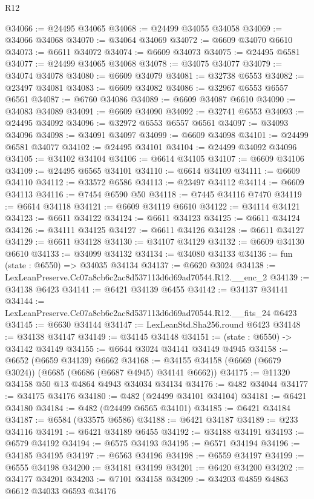 \begin{lexlean}{R12}
\begin{coremodule}
@34066 := @24495 @34065
@34068 := @24499 @34055 @34058
@34069 := @34066 @34068
@34070 := @34064 @34069
@34072 := @6609 @34070 @6610
@34073 := @6611 @34072
@34074 := @6609 @34073
@34075 := @24495 @6581
@34077 := @24499 @34065 @34068
@34078 := @34075 @34077
@34079 := @34074 @34078
@34080 := @6609 @34079
@34081 := @32738 @6553
@34082 := @23497 @34081
@34083 := @6609 @34082
@34086 := @32967 @6553 @6557 @6561
@34087 := @6760 @34086
@34089 := @6609 @34087 @6610
@34090 := @34083 @34089
@34091 := @6609 @34090
@34092 := @32741 @6553
@34093 := @24495 @34092
@34096 := @32972 @6553 @6557 @6561
@34097 := @34093 @34096
@34098 := @34091 @34097
@34099 := @6609 @34098
@34101 := @24499 @6581 @34077
@34102 := @24495 @34101
@34104 := @24499 @34092 @34096
@34105 := @34102 @34104
@34106 := @6614 @34105
@34107 := @6609 @34106
@34109 := @24495 @6565 @34101
@34110 := @6614 @34109
@34111 := @6609 @34110
@34112 := @33572 @6586
@34113 := @23497 @34112
@34114 := @6609 @34113
@34116 := @7454 @6590 @50
@34118 := @7445 @34116 @7470
@34119 := @6614 @34118
@34121 := @6609 @34119 @6610
@34122 := @34114 @34121
@34123 := @6611 @34122
@34124 := @6611 @34123
@34125 := @6611 @34124
@34126 := @34111 @34125
@34127 := @6611 @34126
@34128 := @6611 @34127
@34129 := @6611 @34128
@34130 := @34107 @34129
@34132 := @6609 @34130 @6610
@34133 := @34099 @34132
@34134 := @34080 @34133
@34136 := fun (state : @6550) => @34035 @34134
@34137 := @6620 @3024
@34138 := LexLeanPreserve.Cc07a8cb6c2ac8d537113d6d69ad70544.R12.__enc_2
@34139 := @34138 @6423
@34141 := @6421 @34139 @6455
@34142 := @34137 @34141
@34144 := LexLeanPreserve.Cc07a8cb6c2ac8d537113d6d69ad70544.R12.__fits_24 @6423
@34145 := @6630 @34144
@34147 := LexLeanStd.Sha256.round @6423
@34148 := @34138 @34147
@34149 := @34145 @34148
@34151 := (state : @6550) -> @34142 @34149
@34155 := @6644 @3024 @34141 @34149 @4945
@34158 := @6652 (@6659 @34139) @6662
@34168 := @34155 @34158 (@6669 (@6679 @3024)) (@6685 (@6686 (@6687 @4945) @34141 @6662))
@34175 := @11320 @34158 @50 @13 @4864 @4943 @34034 @34134
@34176 := @482 @34044
@34177 := @34175 @34176
@34180 := @482 (@24499 @34101 @34104)
@34181 := @6421 @34180
@34184 := @482 (@24499 @6565 @34101)
@34185 := @6421 @34184
@34187 := @6584 (@33575 @6586)
@34188 := @6421 @34187
@34189 := @233 @34116
@34191 := @6421 @34189 @6455
@34192 := @34188 @34191
@34193 := @6579 @34192
@34194 := @6575 @34193
@34195 := @6571 @34194
@34196 := @34185 @34195
@34197 := @6563 @34196
@34198 := @6559 @34197
@34199 := @6555 @34198
@34200 := @34181 @34199
@34201 := @6420 @34200
@34202 := @34177 @34201
@34203 := @7101 @34158
@34209 := @34203 @4859 @4863 @6612 @34033 @6593 @34176

\end{coremodule}
\end{lexlean}
